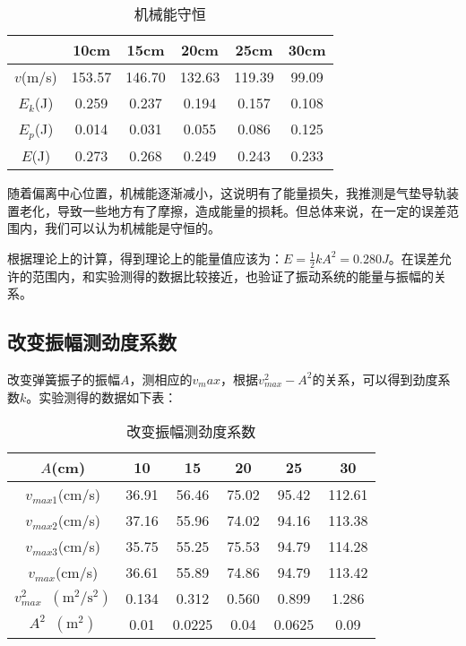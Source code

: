 \documentclass[11pt]{article}
\newcommand*{\unit}[1]{\mathop{}\!\mathrm{#1}}
\begin{document}
\begin{table}[H]
    \centering
    \caption{机械能守恒}
    \begin{tabular}{|c|c|c|c|c|c|}
        \hline
        &10cm&15cm&20cm&25cm&30cm\\
        \hline
        $v$(m/s)&153.57  & 146.70  & 132.63  & 119.39  & 99.09  \\
        \hline
        $E_k$(J)&0.259  & 0.237  & 0.194  & 0.157  & 0.108  \\
        \hline
        $E_p$(J)&0.014  & 0.031  & 0.055  & 0.086  & 0.125  \\
        \hline
        $E$(J)&0.273  & 0.268  & 0.249  & 0.243  & 0.233  \\
        \hline
    \end{tabular}
\end{table}

随着偏离中心位置，机械能逐渐减小，这说明有了能量损失，我推测是气垫导轨装置老化，导致一些地方有了摩擦，造成能量的损耗。但总体来说，在一定的误差范围内，我们可以认为机械能是守恒的。

根据理论上的计算，得到理论上的能量值应该为：$\displaystyle E=\frac{1}{2} kA^2 = 0.280 J$。在误差允许的范围内，和实验测得的数据比较接近，也验证了振动系统的能量与振幅的关系。

\subsection{改变振幅测劲度系数}

改变弹簧振子的振幅$A$，测相应的$v_max$，根据$v_{max} ^2 - A^2$的关系，可以得到劲度系数$k$。实验测得的数据如下表：

\begin{table}[H]
    \centering
    \caption{改变振幅测劲度系数}
    \begin{tabular}{|c|c|c|c|c|c|}
        \hline
        $A$(cm)&10&15&20&25&30\\
        \hline
        $v_{max1}$(cm/s)&36.91  & 56.46  & 75.02  & 95.42  & 112.61  \\
        \hline
        $v_{max2}$(cm/s)&37.16  & 55.96  & 74.02  & 94.16  & 113.38  \\
        \hline
        $v_{max3}$(cm/s)&35.75  & 55.25  & 75.53  & 94.79  & 114.28  \\
        \hline
        $v_{max}$(cm/s)&36.61  & 55.89  & 74.86  & 94.79  & 113.42  \\
        \hline
        $v_{max}^2 \unit{(m^2/s^2)}$&0.134  & 0.312  & 0.560  & 0.899  & 1.286  \\
        \hline
        $A^2 \unit{(m^2)}$&0.01  & 0.0225 & 0.04  & 0.0625 & 0.09 \\
        \hline
    \end{tabular}
\end{table}
\end{document}
